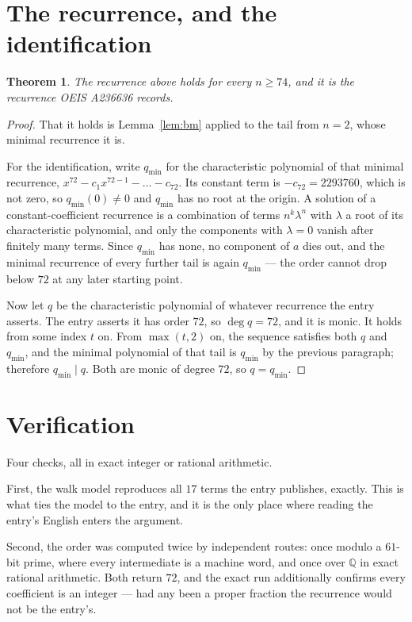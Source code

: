\documentclass[11pt,a4paper]{article}
\theoremstyle{plain}
\newtheorem{theorem}{Theorem}
\theoremstyle{definition}
\begin{document}
\section{The recurrence, and the identification}

\begin{theorem}
The recurrence above holds for every $n\ge74$, and it is the recurrence OEIS A236636 records.
\end{theorem}

\begin{proof}
That it holds is Lemma~\ref{lem:bm} applied to the tail from $n=2$, whose minimal
recurrence it is.

For the identification, write $q_{\min}$ for the characteristic polynomial of that minimal
recurrence, $x^{72}-c_1x^{72-1}-\dots-c_{72}$. Its constant term is
$-c_{72}=2293760$, which is not zero, so $q_{\min}(0)\neq0$ and $q_{\min}$ has no
root at the origin. A solution of a constant-coefficient recurrence is a combination of terms
$n^{k}\lambda^{n}$ with $\lambda$ a root of its characteristic polynomial, and only the
components with $\lambda=0$ vanish after finitely many terms. Since $q_{\min}$ has none, no
component of $a$ dies out, and the minimal recurrence of every further tail is again
$q_{\min}$ --- the order cannot drop below $72$ at any later starting point.

Now let $q$ be the characteristic polynomial of whatever recurrence the entry asserts. The
entry asserts it has order $72$, so $\deg q=72$, and it is monic. It holds from some
index $t$ on. From $\max(t,2)$ on, the sequence satisfies both $q$ and $q_{\min}$, and
the minimal polynomial of that tail is $q_{\min}$ by the previous paragraph; therefore
$q_{\min}\mid q$. Both are monic of degree $72$, so $q=q_{\min}$.
\end{proof}

\section{Verification}

Four checks, all in exact integer or rational arithmetic.

First, the walk model reproduces all $17$ terms the entry publishes, exactly. This is
what ties the model to the entry, and it is the only place where reading the entry's English
enters the argument.

Second, the order was computed twice by independent routes: once modulo a $61$-bit prime, where
every intermediate is a machine word, and once over $\mathbb{Q}$ in exact rational arithmetic.
Both return $72$, and the exact run additionally confirms every coefficient is an integer
--- had any been a proper fraction the recurrence would not be the entry's.
\end{document}
